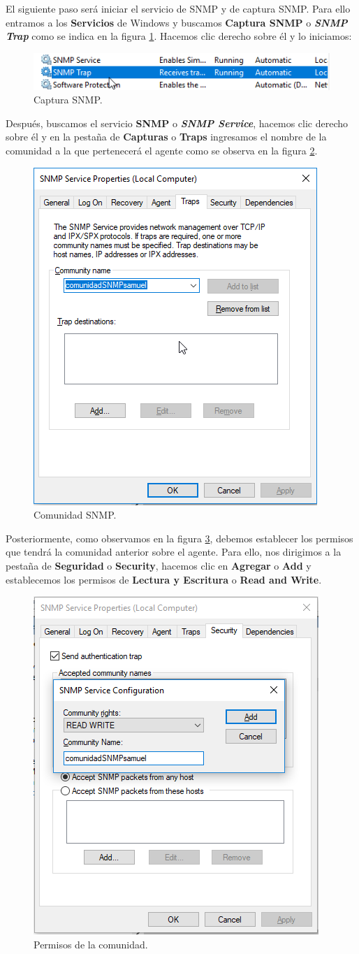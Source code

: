 El siguiente paso será iniciar el servicio de SNMP y de captura SNMP. Para ello entramos a los \textbf{Servicios} de Windows y buscamos \textbf{Captura SNMP} o \textbf{\textit{SNMP Trap}} como se indica en la figura \ref{image:startSNMPtrap}. Hacemos clic derecho sobre él y lo iniciamos:

\FloatBarrier
\begin{figure}[htbp!]
		\centering
			\includegraphics[width=.5 \textwidth]{images/startSNMPtrap}
		\caption{Captura SNMP.}
		\label{image:startSNMPtrap}
\end{figure}
\FloatBarrier

Después, buscamos el servicio \textbf{SNMP} o \textbf{\textit{SNMP Service}}, hacemos clic derecho sobre él y en la pestaña de \textbf{Capturas} o \textbf{Traps} ingresamos el nombre de la comunidad a la que pertenecerá el agente como se observa en la figura \ref{image:comunidad}.

\FloatBarrier
\begin{figure}[htbp!]
		\centering
			\includegraphics[width=.4 \textwidth]{images/comunidad}
		\caption{Comunidad SNMP.}
		\label{image:comunidad}
\end{figure}
\FloatBarrier

Posteriormente, como observamos en la figura \ref{image:permisos}, debemos establecer los permisos que tendrá la comunidad anterior sobre el agente. Para ello, nos dirigimos a la pestaña de \textbf{Seguridad} o \textbf{Security}, hacemos clic en \textbf{Agregar} o \textbf{Add} y establecemos los permisos de \textbf{Lectura y Escritura} o \textbf{Read and Write}.

\FloatBarrier
\begin{figure}[htbp!]
		\centering
			\includegraphics[width=.4 \textwidth]{images/permisos}
		\caption{Permisos de la comunidad.}
		\label{image:permisos}
\end{figure}
\FloatBarrier

